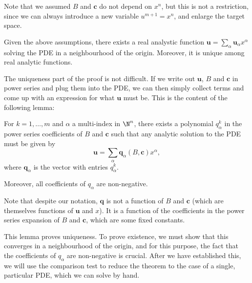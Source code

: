 \documentclass[a4paper]{article}
\begin{document}
Note that we assumed $B$ and $\mathbf{c}$ do not depend on $x^n$, but this is not a restriction, since we can always introduce a new variable $u^{m + 1} = x^n$, and enlarge the target space.

\begin{thm}
  Given the above assumptions, there exists a real analystic function $\mathbf{u} = \sum_\alpha \mathbf{u}_\alpha x^\alpha$ solving the PDE in a neighbourhood of the origin. Moreover, it is unique among real analytic functions.
\end{thm}

The uniqueness part of the proof is not difficult. If we write out $\mathbf{u}$, $B$ and $\mathbf{c}$ in power series and plug them into the PDE, we can then simply collect terms and come up with an expression for what $\mathbf{u}$ must be. This is the content of the following lemma:

\begin{lemma}
  For $k = 1, \ldots, m$ and $\alpha$ a multi-index in $\N^n$, there exists a polynomial $q_\alpha^k$ in the power series coefficients of $B$ and $\mathbf{c}$ such that any analytic solution to the PDE must be given by
  \[
    \mathbf{u} = \sum_{\alpha} \mathbf{q}_\alpha(B, \mathbf{c}) x^\alpha,
  \]
  where $\mathbf{q}_\alpha$ is the vector with entries $q_\alpha^k$.

  Moreover, all coefficients of $q_\alpha$ are non-negative.
\end{lemma}
Note that despite our notation, $\mathbf{q}$ is not a function of $B$ and $\mathbf{c}$ (which are themselves functions of $\mathbf{u}$ and $x$). It is a function of the coefficients in the power series expansion of $B$ and $\mathbf{c}$, which are some fixed constants.

This lemma proves uniqueness. To prove existence, we must show that this converges in a neighbourhood of the origin, and for this purpose, the fact that the coefficients of $q_\alpha$ are non-negative is crucial. After we have established this, we will use the comparison test to reduce the theorem to the case of a single, particular PDE, which we can solve by hand.
\end{document}
